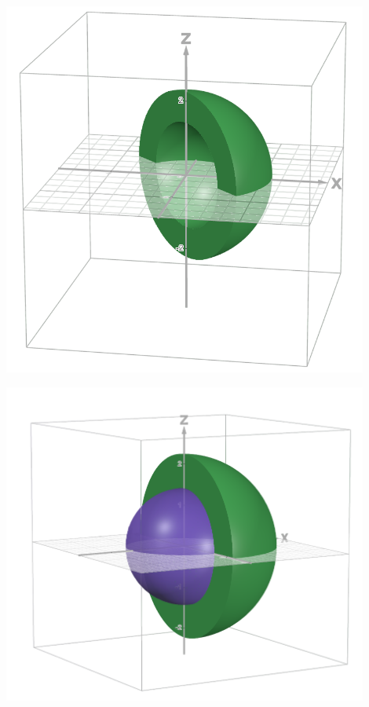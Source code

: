 \documentclass{article}
\begin{document}
\begin{examplebox}
\begin{solutionbox}
\begin{center}
\begin{minipage}{0.3\textwidth}
                \includegraphics[width=0.9\textwidth]{region between 2 see thru.png}
                \captionsetup{justification=centerlast}
            \end{minipage}%
            \hfill
            \begin{minipage}{0.3\textwidth}
                \centering
                \includegraphics[width=0.9\textwidth]{region between 2 see thru with inner sphere.png}
                \captionsetup{justification=centerlast}
            \end{minipage}
        \end{center}        
    \end{solutionbox}
\end{examplebox}
\end{document}
